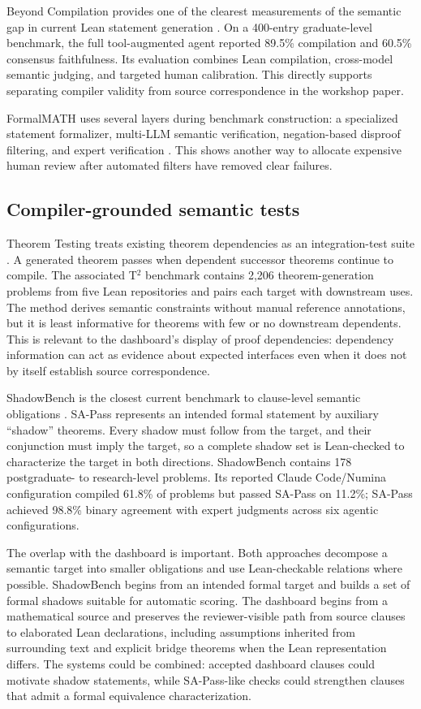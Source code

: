 \documentclass[11pt]{article}
\begin{document}
Beyond Compilation provides one of the clearest measurements of the semantic
gap in current Lean statement generation \citep{zhang2026beyondcompilation}.
On a 400-entry graduate-level benchmark, the full tool-augmented agent reported
89.5\% compilation and 60.5\% consensus faithfulness.  Its evaluation combines
Lean compilation, cross-model semantic judging, and targeted human calibration.
This directly supports separating compiler validity from source correspondence
in the workshop paper.

FormalMATH uses several layers during benchmark construction: a specialized
statement formalizer, multi-LLM semantic verification, negation-based disproof
filtering, and expert verification \citep{yu2025formalmath}.  This shows another
way to allocate expensive human review after automated filters have removed
clear failures.

\subsection{Compiler-grounded semantic tests}

Theorem Testing treats existing theorem dependencies as an integration-test
suite \citep{kim2026theoremtesting}.  A generated theorem passes when dependent
successor theorems continue to compile.  The associated T$^2$ benchmark contains
2,206 theorem-generation problems from five Lean repositories and pairs each
target with downstream uses.  The method derives semantic constraints without
manual reference annotations, but it is least informative for theorems with few
or no downstream dependents.  This is relevant to the dashboard's display of
proof dependencies: dependency information can act as evidence about expected
interfaces even when it does not by itself establish source correspondence.

ShadowBench is the closest current benchmark to clause-level semantic
obligations \citep{han2026shadowbench}.  SA-Pass represents an intended formal
statement by auxiliary ``shadow'' theorems.  Every shadow must follow from the
target, and their conjunction must imply the target, so a complete shadow set is
Lean-checked to characterize the target in both directions.  ShadowBench
contains 178 postgraduate- to research-level problems.  Its reported Claude
Code/Numina configuration compiled 61.8\% of problems but passed SA-Pass on
11.2\%; SA-Pass achieved 98.8\% binary agreement with expert judgments across
six agentic configurations.

The overlap with the dashboard is important.  Both approaches decompose a
semantic target into smaller obligations and use Lean-checkable relations where
possible.  ShadowBench begins from an intended formal target and builds a set of
formal shadows suitable for automatic scoring.  The dashboard begins from a
mathematical source and preserves the reviewer-visible path from source clauses
to elaborated Lean declarations, including assumptions inherited from surrounding
text and explicit bridge theorems when the Lean representation differs.  The
systems could be combined: accepted dashboard clauses could motivate shadow
statements, while SA-Pass-like checks could strengthen clauses that admit a
formal equivalence characterization.
\end{document}
